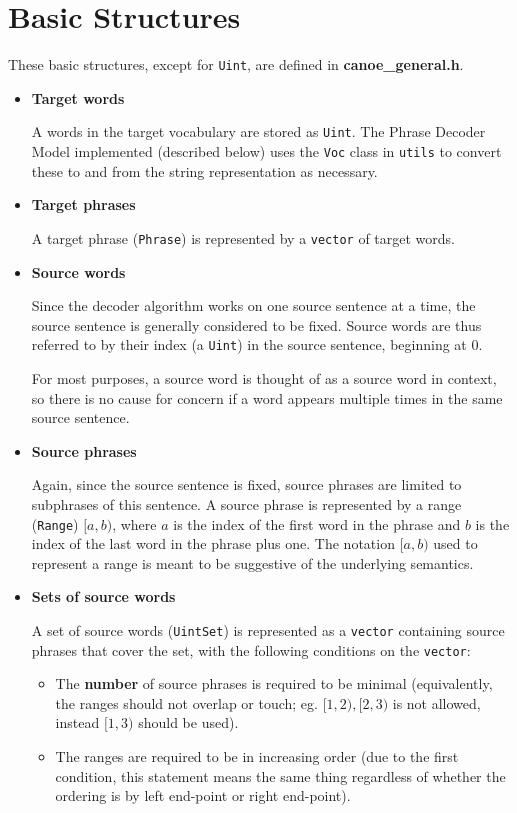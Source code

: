 \documentclass[12pt]{amsart} \usepackage{epsfig} \usepackage{rotating}
\newcommand{\file}{\textbf} \newcommand{\url}{\underline}
\newcommand{\code}{\small\texttt}
\begin{document}
\section{Basic Structures}
These basic structures, except for \code{Uint}, are defined in
\file{canoe\_general.h}.

\begin{itemize}

\item {\bf Target words} \par A words in the target vocabulary are stored as
\code{Uint}.  The Phrase Decoder Model implemented (described below) uses
the \code{Voc} class in \code{utils} to convert these to and from the string
representation as necessary.

\item {\bf Target phrases} \par A target phrase (\code{Phrase}) is represented
by a \code{vector} of target words.

\item {\bf Source words} \par Since the decoder algorithm works on one source
sentence at a time, the source sentence is generally considered to be fixed.
Source words are thus referred to by their index (a \code{Uint}) in the source
sentence, beginning at 0.

For most purposes, a source word is thought of as a source word in context, so
there is no cause for concern if a word appears multiple times in the same
source sentence.

\item {\bf Source phrases} \par Again, since the source sentence is fixed,
source phrases are limited to subphrases of this sentence.  A source phrase is
represented by a range (\code{Range}) $[a, b)$, where $a$ is the index of the
first word in the phrase and $b$ is the index of the last word in the phrase
plus one.  The notation $[a, b)$ used to represent a range is meant to be
suggestive of the underlying semantics.

\item {\bf Sets of source words} \par A set of source words (\code{UintSet}) is
represented as a \code{vector} containing source phrases that cover the set,
with the following conditions on the \code{vector}:

\begin{itemize}
\item
The \textbf{number} of source phrases is required to be minimal (equivalently,
the ranges should not overlap or touch; eg. $[1, 2), [2, 3)$ is not allowed,
instead $[1, 3)$ should be used).
\item
The ranges are required to be in increasing order (due to the first condition,
this statement means the same thing regardless of whether the ordering is by
left end-point or right end-point).
\end{itemize}

\end{itemize}
\end{document}
